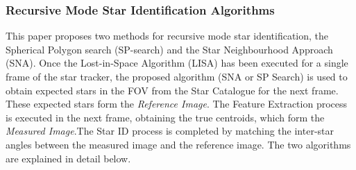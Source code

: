\documentclass[../../main.tex]{subfiles}
\begin{document}
\subsubsection{Recursive Mode Star Identification Algorithms}
This paper proposes two methods for recursive mode star identification, the Spherical Polygon search (SP-search) and the Star Neighbourhood Approach (SNA). Once the Lost-in-Space Algorithm (LISA) has been executed for a single frame of the star tracker, the proposed algorithm (SNA or SP Search) is used to obtain expected stars in the FOV from the Star Catalogue for the next frame. These expected stars form the \textit{Reference Image}.
The Feature Extraction process is executed in the next frame, obtaining the true centroids, which form the \textit{Measured Image}.The Star ID process is completed by matching the inter-star angles between the measured image and the reference image. The two algorithms are explained in detail below. 
\end{document}
